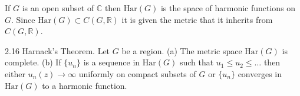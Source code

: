 If $G$ is an open subset of $\mathbb{C}$ then $\text{Har}(G)$ is the space of harmonic functions on $G$. Since $\text{Har}(G) \subset C(G, \mathbb{R})$ it is given the metric that it inherits from $C(G, \mathbb{R})$.

2.16 Harnack’s Theorem. Let $G$ be a region. (a) The metric space $\text{Har}(G)$ is complete. (b) If $\{u_n\}$ is a sequence in $\text{Har}(G)$ such that $u_1 \leq u_2 \leq \ldots$ then either $u_n(z) \to \infty$ uniformly on compact subsets of $G$ or $\{u_n\}$ converges in $\text{Har}(G)$ to a harmonic function.